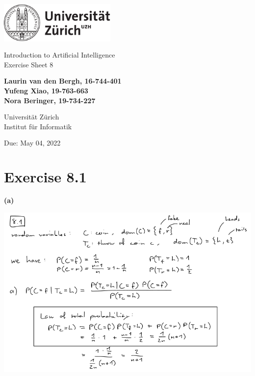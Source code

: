 \documentclass[12pt]{article}
\begin{document}
\begin{titlepage}
\includegraphics[height=20mm]{../images/uzh_logo}\\

\begin{flushleft}

\vspace{2cm}

{\Large Introduction to Artificial Intelligence\\Exercise Sheet 8}\\

\vspace{4cm}

\textbf{Laurin van den Bergh, 16-744-401\\Yufeng Xiao, 19-763-663\\Nora Beringer, 19-734-227}\\

\vspace{2cm}

Universität Zürich\\
Institut für Informatik

\vfill Due: May 04, 2022

\vspace{3cm}


\end{flushleft}
\end{titlepage}

\newpage

\section*{Exercise 8.1}

\textbf{(a)} 

\includegraphics[width=\textwidth]{figures/8.1a.png}
\end{document}
